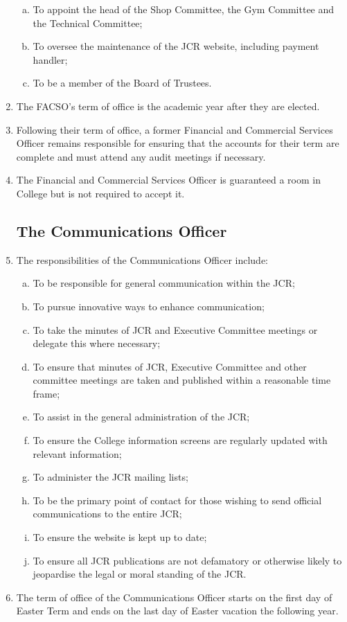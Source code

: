 \documentclass[12pt]{article}
\begin{document}
\begin{enumerate}
\begin{enumerate}[(a)]
        \item To appoint the head of the Shop Committee, the Gym Committee and the Technical Committee;
        \item To oversee the maintenance of the JCR website, including payment handler;
        \item To be a member of the Board of Trustees.
    \end{enumerate}
    \item The FACSO's term of office is the academic year after they are elected.
    \item Following their term of office, a former Financial and Commercial Services Officer remains responsible for ensuring that the accounts for their term are complete and must attend any audit meetings if necessary.
    \item The Financial and Commercial Services Officer is guaranteed a room in College but is not required to accept it.
    \subsection{The Communications Officer}
    \item The responsibilities of the Communications Officer include:
    \begin{enumerate}[(a)]
        \item To be responsible for general communication within the JCR;
        \item To pursue innovative ways to enhance communication;
        \item To take the minutes of JCR and Executive Committee meetings or delegate this where necessary;
        \item To ensure that minutes of JCR, Executive Committee and other committee meetings are taken and published within a reasonable time frame;
        \item To assist in the general administration of the JCR;
        \item To ensure the College information screens are regularly updated with relevant information;
        \item To administer the JCR mailing lists;
        \item To be the primary point of contact for those wishing to send official communications to the entire JCR;
        \item To ensure the website is kept up to date;
        \item To ensure all JCR publications are not defamatory or otherwise likely to jeopardise the legal or moral standing of the JCR.
    \end{enumerate}
    \item The term of office of the Communications Officer starts on the first day of Easter Term and ends on the last day of Easter vacation the following year.

\end{enumerate}
\end{document}

